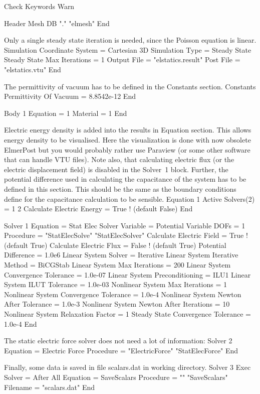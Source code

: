 \ttbegin
Check Keywords Warn

Header
  Mesh DB "." "elmesh"
End
\ttend

Only a single steady state iteration is needed, since the Poisson
equation is linear.
\ttbegin
Simulation
  Coordinate System = Cartesian 3D
  Simulation Type = Steady State
  Steady State Max Iterations = 1
  Output File = "elstatics.result"
  Post File = "elstatics.vtu"
End
\ttend

The permittivity of vacuum has to be defined in the Constants section.
\ttbegin
Constants
  Permittivity Of Vacuum = 8.8542e-12
End

Body 1
  Equation = 1
  Material = 1
End
\ttend

Electric energy density is added into the results in Equation
section. This allows energy density to be visualised.
Here the visualization is done with now obsolete ElmerPost
but you would probably rather use Paraview (or some other software that
can handle VTU files). 
Note also, that calculating electric flux (or the electric
displacement field) is disabled in the Solver~1 block. Further, the
potential difference used in calculating the capacitance of the system
has to be defined in this section. This should be the same as the
boundary conditions define for the capacitance calculation to be
sensible.
\ttbegin
Equation 1
  Active Solvers(2) = 1 2
  Calculate Electric Energy = True  ! (default False)
End

Solver 1
  Equation = Stat Elec Solver
  Variable = Potential
  Variable DOFs = 1
  Procedure = "StatElecSolve" "StatElecSolver"
  Calculate Electric Field = True  ! (default True)
  Calculate Electric Flux = False  ! (default True)
  Potential Difference = 1.0e6
  Linear System Solver = Iterative
  Linear System Iterative Method = BiCGStab
  Linear System Max Iterations = 200
  Linear System Convergence Tolerance = 1.0e-07
  Linear System Preconditioning = ILU1
  Linear System ILUT Tolerance = 1.0e-03
  Nonlinear System Max Iterations = 1
  Nonlinear System Convergence Tolerance = 1.0e-4
  Nonlinear System Newton After Tolerance = 1.0e-3
  Nonlinear System Newton After Iterations = 10
  Nonlinear System Relaxation Factor = 1
  Steady State Convergence Tolerance = 1.0e-4
End
\ttend

The static electric force solver does not need a lot of information:
\ttbegin
Solver 2
  Equation = Electric Force
  Procedure = "ElectricForce" "StatElecForce"
End
\ttend

Finally, some data is saved in file scalars.dat in working directory.
\ttbegin
Solver 3
  Exec Solver = After All
  Equation = SaveScalars
  Procedure = "" "SaveScalars"
  Filename = "scalars.dat"
End
\ttend

